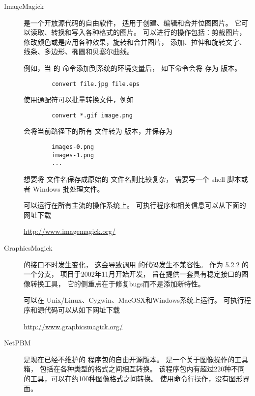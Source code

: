 \begin{description}
	\item[ImageMagick] 
	
	 是一个开放源代码的自由软件，
	适用于创建、编辑和合并位图图片。
	它可以读取、转换和写入各种格式的图片。
	可以进行的操作包括：剪裁图片，修改颜色或是应用各种效果，旋转和合并图片，
	添加、拉伸和旋转文字、线条、多边形、椭圆和贝塞尔曲线。
	
	例如，当  的  命令添加到系统的环境变量后，
	如下命令会将  存为  版本。
\begin{verbatim}
		convert file.jpg file.eps
\end{verbatim}
	
	使用通配符可以批量转换文件，例如
\begin{verbatim}
		convert *.gif image.png
\end{verbatim}
	会将当前路径下的所有  文件转为  版本，并保存为
\begin{verbatim}
		images-0.png
		images-1.png
		...
\end{verbatim}
	想要将  文件名保存成原始的  文件名则比较复杂，
	需要写一个 shell 脚本或者 Windows 批处理文件。
	
	 可以运行在所有主流的操作系统上。
	可执行程序和相关信息可以从下面的网址下载
	\begin{center}
		\url{http://www.imagemagick.org/}
	\end{center}
	
	\item[GraphicsMagick]
	 的接口不时发生变化，
	这会导致调用  的代码发生不兼容性。
	作为  5.2.2 的一个分支，
	 项目于2002年11月开始开发，
	旨在提供一套具有稳定接口的图像转换工具，
	它的侧重点在于修复bugs而不是添加新特性。
	
	 可以在 Unix/Linux、Cygwin、MacOSX和Windows系统上运行。
	可执行程序和源代码可以从如下网址下载
	\begin{center}
		\url{http://www.graphicsmagick.org/}
	\end{center}
	
	\item[NetPBM]
	 是现在已经不维护的  程序包的自由开源版本。
	 是一个关于图像操作的工具箱，
	包括在各种类型的格式之间相互转换。
	该程序包内有超过220种不同的工具，可以在约100种图像格式之间转换。
	 使用命令行操作，没有图形界面。
	

\end{description}
